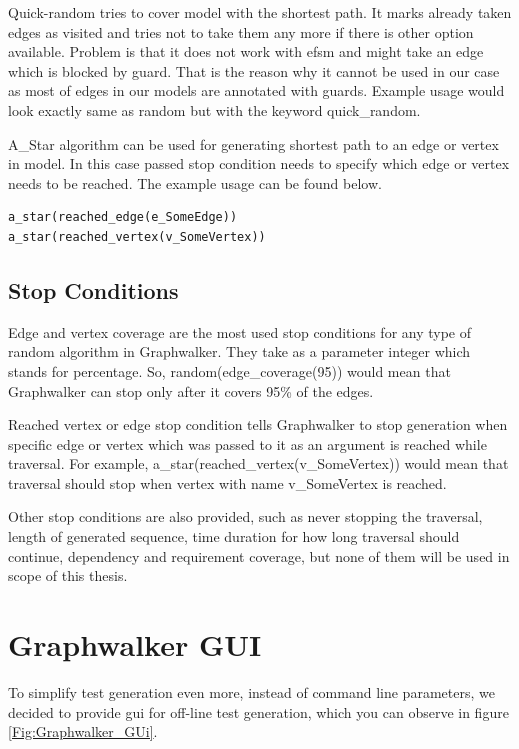 \par
Quick-random tries to cover model with the shortest path. It marks already taken edges 
as visited and tries not to take them any more if there is other option available. Problem is that it does not work with \acrshort{efsm} and might take an edge which is blocked by guard. That is the reason why it cannot be used in our case as most of edges in our models are annotated with guards. Example usage would look exactly same as random but with the keyword quick\_random.

\par
A\_Star algorithm can be used for generating shortest path to an edge or vertex in model. In this case passed stop condition needs to specify which edge or vertex needs to be reached. The example usage can be found below.

\begin{lstlisting}
a_star(reached_edge(e_SomeEdge))
a_star(reached_vertex(v_SomeVertex))
\end{lstlisting}

\subsection{Stop Conditions}
\par
Edge and vertex coverage are the most used stop conditions for any type of random algorithm in Graphwalker. They take as a parameter integer which stands for percentage. So, random(edge\_coverage(95)) would mean that Graphwalker can stop only after it covers 95\% of the edges.

\par
Reached vertex or edge stop condition tells Graphwalker to stop generation when specific edge or vertex which was passed to it as an argument is reached while traversal. For example, a\_star(reached\_vertex(v\_SomeVertex)) would mean that traversal should stop when vertex with name v\_SomeVertex is reached.

\par
Other stop conditions are also provided, such as never stopping the traversal, length of generated sequence, time duration for how long traversal should continue, dependency and requirement coverage, but none of them will be used in scope of this thesis.

\section{Graphwalker GUI}
\par
To simplify test generation even more, instead of command line parameters, we decided to provide \acrshort{gui} for off-line test generation, which you can observe in figure \ref{Fig:Graphwalker_GUi}.


